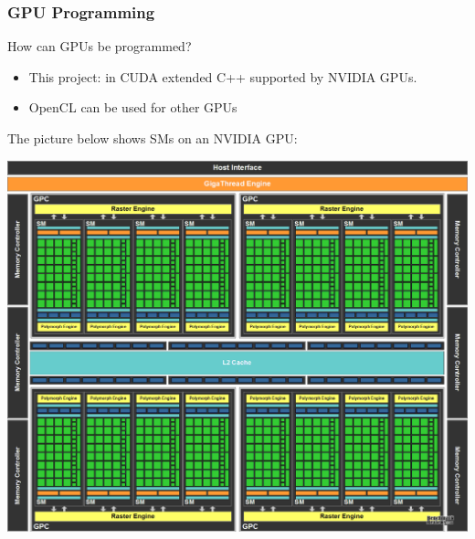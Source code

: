 \documentclass[mathserif]{beamer}
\begin{document}
\begin{frame}                                                                                                                                                                          
\frametitle{GPU Programming}
How can GPUs be programmed?
\begin{itemize}
\item This project: in CUDA extended C++ supported by NVIDIA GPUs.  
\item OpenCL can be used for other GPUs 
\end{itemize}
The picture below shows SMs on an NVIDIA GPU:
\begin{center}
\includegraphics[scale=0.08]{gpu.png}
\end{center}

\end{frame}             
 
\end{document}
